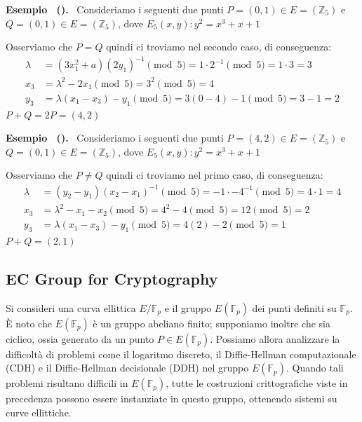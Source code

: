 \documentclass[a4paper, 11pt]{article}
\newenvironment{example}[1][]{
  \par\noindent\textbf{Esempio%
  \if\relax\detokenize{#1}\relax\else\ (\textbf{#1})\fi.}\ }{}
\begin{document}
\begin{example}
    Consideriamo i seguenti due punti $P = (0, 1) \in E=(\mathbb{Z}_5)$ e $Q = (0, 1) \in E=(\mathbb{Z}_5)$, dove $E_5(x, y): y^2 = x^3 + x + 1$
    
    Osserviamo che $P = Q$ quindi ci troviamo nel secondo caso, di conseguenza:
    \begin{align*}
        \lambda &= (3x_1^2 + a)(2y_1)^{-1} \pmod 5 = 1 \cdot 2^{-1} \pmod 5 = 1 \cdot 3 = 3 \\
        x_3 &= \lambda^2 -2x_1 \pmod 5 = 3^2 \pmod 5 = 4 \\
        y_3 &= \lambda(x_1 - x_3) - y_1 \pmod 5 = 3(0 - 4) - 1 \pmod 5 = 3 - 1 = 2
    \end{align*}
    $P + Q = 2P = (4, 2)$
\end{example}
\begin{example}
    Consideriamo i seguenti due punti $P = (4, 2) \in E=(\mathbb{Z}_5)$ e $Q = (0, 1) \in E=(\mathbb{Z}_5)$, dove $E_5(x, y): y^2 = x^3 + x + 1$
    
    Osserviamo che $P \neq Q$ quindi ci troviamo nel primo caso, di conseguenza:
    \begin{align*}
        \lambda &= (y_2 - y_1)(x_2 - x_1)^{-1} \pmod 5 = -1 \cdot -4^{-1} \pmod 5 = 4 \cdot 1 = 4 \\
        x_3 &= \lambda^2 -x_1 -x_2 \pmod 5 = 4^2 - 4 \pmod 5 = 12 \pmod 5 = 2 \\
        y_3 &= \lambda(x_1 - x_3) - y_1 \pmod 5 = 4(2) - 2 \pmod 5 = 1
    \end{align*}
    $P + Q = (2, 1)$
\end{example}

\subsection{EC Group for Cryptography}

Si consideri una curva ellittica $E/\mathbb{F}_p$ e il gruppo $E(\mathbb{F}_p)$ dei punti definiti su $\mathbb{F}_p$. È noto che $E(\mathbb{F}_p)$ è un gruppo abeliano finito; supponiamo inoltre che sia ciclico, ossia generato da un punto $P \in E(\mathbb{F}_p)$. Possiamo allora analizzare la difficoltà di problemi come il logaritmo discreto, il Diffie-Hellman computazionale (CDH) e il Diffie-Hellman decisionale (DDH) nel gruppo $E(\mathbb{F}_p)$. Quando tali problemi risultano difficili in $E(\mathbb{F}_p)$, tutte le costruzioni crittografiche viste in precedenza possono essere instanziate in questo gruppo, ottenendo sistemi su curve ellittiche.
\end{document}
